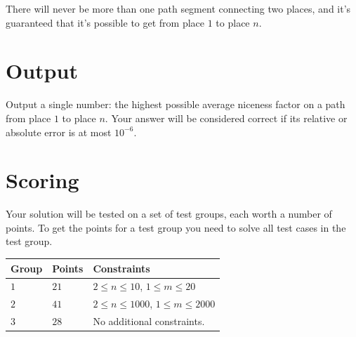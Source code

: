 There will never be more than one path segment connecting two places, and it's guaranteed that it's possible to get from place $1$ to place $n$.

\section*{Output}
Output a single number: the highest possible average niceness factor on a path from place $1$ to place $n$.
Your answer will be considered correct if its relative or absolute error is at most $10^{-6}$.

\section*{Scoring}
Your solution will be tested on a set of test groups, each worth a number of points.
To get the points for a test group you need to solve all test cases in the test group.

\noindent
\begin{tabular}{| l | l | p{12cm} |}
  \hline
  Group & Points & Constraints \\ \hline
  $1$   & $21$       & $2 \le n \le 10$, $1 \le m \le 20$ \\ \hline
  $2$   & $41$       & $2 \le n \le 1000$, $1 \le m \le 2000$\\ \hline
  $3$   & $28$       & No additional constraints. \\ \hline
\end{tabular}
